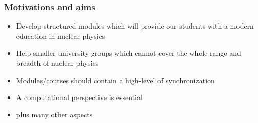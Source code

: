 \documentclass{beamer}
\begin{document}
\begin{frame}
\frametitle{Motivations and aims}

\begin{block}{}
\begin{itemize}
\item Develop structured modules which will provide our students with a modern education in nuclear physics

\item Help smaller university groups which cannot cover the whole range and breadth of nuclear physics

\item Modules/courses should contain a high-level of synchronization

\item A computational perspective is essential

\item plus many other aspects
\end{itemize}

\noindent
\end{block}
\end{frame}
\end{document}
